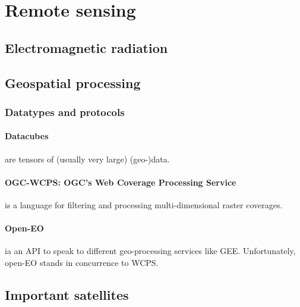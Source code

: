 \section{Remote sensing}

\subsection{Electromagnetic radiation}



\subsection{Geospatial processing}

\subsubsection{Datatypes and protocols}

\paragraph{Datacubes} are tensors of (usually very large) (geo-)data.

\paragraph{OGC-WCPS: OGC's Web Coverage Processing Service} is a language for filtering and processing multi-dimensional raster coverages. 

\paragraph{Open-EO} ia an API to speak to different geo-processing services like GEE. Unfortunately, open-EO stands in concurrence to WCPS. 



\subsection{Important satellites}

